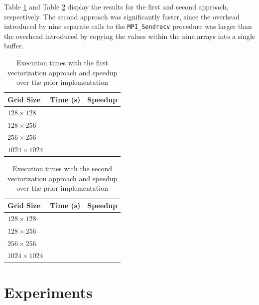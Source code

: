 \documentclass[twocolumn, a4paper]{article}
\begin{document}
Table \ref{tab:vectorization_1} and Table \ref{tab:vectorization_2} display the results for the first and second approach, respectively.
The second approach was significantly faster, since the overhead introduced by nine separate calls to the \texttt{MPI\_Sendrecv} procedure was larger than the overhead introduced by copying the values within the nine arrays into a single buffer.

\begin{table}[htbp]
  \begin{center}
  \caption{Execution times with the first vectorization approach and speedup over the prior implementation}\label{tab:vectorization_1}
  \begin{tabular}[t]{l | l l} 
      \hline\hline
      Grid Size&Time (s)&Speedup\\
      \hline
      $128 \times 128$&\texttt{}&\texttt{}\\
      $128 \times 256$&\texttt{}&\texttt{}\\
      $256 \times 256$&\texttt{}&\texttt{}\\
      $1024 \times 1024$&\texttt{}&\texttt{}\\
      \hline
    \end{tabular}
  \end{center}
\end{table}

\begin{table}[htbp]
  \begin{center}
  \caption{Execution times with the second vectorization approach and speedup over the prior implementation}\label{tab:vectorization_2}
  \begin{tabular}[t]{l | l l} 
      \hline\hline
      Grid Size&Time (s)&Speedup\\
      \hline
      $128 \times 128$&\texttt{}&\texttt{}\\
      $128 \times 256$&\texttt{}&\texttt{}\\
      $256 \times 256$&\texttt{}&\texttt{}\\
      $1024 \times 1024$&\texttt{}&\texttt{}\\
      \hline
    \end{tabular}
  \end{center}
\end{table}

\section{Experiments}
\end{document}
